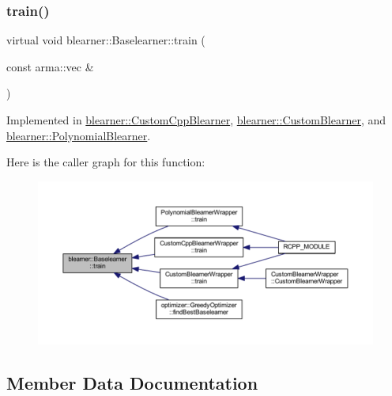 \subsubsection{\texorpdfstring{train()}{train()}}
{\footnotesize\ttfamily virtual void blearner\+::\+Baselearner\+::train (\begin{DoxyParamCaption}\item[{const arma\+::vec \&}]{ }\end{DoxyParamCaption})\hspace{0.3cm}{\ttfamily [pure virtual]}}



Implemented in \mbox{\hyperlink{classblearner_1_1_custom_cpp_blearner_aa71b777d7092a3d9b47a9bed125eb0f9}{blearner\+::\+Custom\+Cpp\+Blearner}}, \mbox{\hyperlink{classblearner_1_1_custom_blearner_a4726c5b861b67817f7b3eb61d8f6c0d7}{blearner\+::\+Custom\+Blearner}}, and \mbox{\hyperlink{classblearner_1_1_polynomial_blearner_acf24025a73293a2569450dd4659e0997}{blearner\+::\+Polynomial\+Blearner}}.

Here is the caller graph for this function\+:\nopagebreak
\begin{figure}[H]
\begin{center}
\leavevmode
\includegraphics[width=350pt]{classblearner_1_1_baselearner_a40e03ad070b9a03aae706d9ee8094b80_icgraph}
\end{center}
\end{figure}


\subsection{Member Data Documentation}
\mbox{\label{classblearner_1_1_baselearner_a7112e057b2b29bb6529df6df3b8a9165}} 
